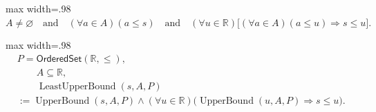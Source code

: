 \begin{remark*}
\begin{center}\begin{adjustbox}{max width=.98\linewidth}$\displaystyle A\neq\varnothing \quad\text{and}\quad (\forall a\in A)(a\leq s) \quad\text{and}\quad (\forall u\in\mathbb{R})\bigl[(\forall a\in A)(a\leq u)\Rightarrow s\leq u\bigr].$\end{adjustbox}\end{center}
\end{remark*}

\begin{remark*}
\begin{center}\begin{adjustbox}{max width=.98\linewidth}$\displaystyle \begin{aligned}&P=\mathsf{OrderedSet}(\mathbb{R},\leq),\\ &\qquad A\subseteq\mathbb{R},\\ &\qquad \operatorname{LeastUpperBound}(s,A,P) \\ &:= \operatorname{UpperBound}(s,A,P) \land (\forall u\in\mathbb{R}) \bigl(\operatorname{UpperBound}(u,A,P)\Rightarrow s\leq u\bigr).\end{aligned}$\end{adjustbox}\end{center}
\end{remark*}
